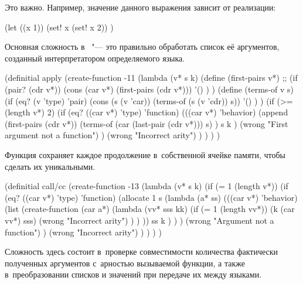 \noindent
Это важно. Например, значение данного выражения зависит от реализации:

\begin{code:lisp}
(let ((x 1))
  (set! x (set! x 2)) )
\end{code:lisp}



Основная сложность в~ "--- это правильно обработать список её
аргументов, созданный интерпретатором определяемого языка.

\begin{code:lisp}
(definitial apply
  (create-function
   -11 (lambda (v* s k)
         (define (first-pairs v*)
           ;; 
           (if (pair? (cdr v*))
               (cons (car v*) (first-pairs (cdr v*)))
               '() ) )
         (define (terms-of v s)
           (if (eq? (v 'type) 'pair)
               (cons (s (v 'car)) (terms-of (s (v 'cdr)) s))
               '() ) )
         (if (>= (length v*) 2)
             (if (eq? ((car v*) 'type) 'function)
                 (((car v*) 'behavior)
                  (append (first-pairs (cdr v*))
                          (terms-of (car (last-pair (cdr v*))) s) )
                  s k )
                 (wrong "First argument not a function") )
             (wrong "Incorrect arity") ) ) ) )
\end{code:lisp}

Функция  сохраняет каждое продолжение в~собственной ячейке памяти,
чтобы сделать их уникальными.

\begin{code:lisp}
(definitial call/cc
  (create-function
   -13 (lambda (v* s k)
         (if (= 1 (length v*))
             (if (eq? ((car v*) 'type) 'function)
                 (allocate 1 s
                  (lambda (a* ss)
                    (((car v*) 'behavior)
                     (list (create-function
                            (car a*)
                            (lambda (vv* sss kk)
                              (if (= 1 (length vv*))
                                  (k (car vv*) sss)
                                  (wrong "Incorrect arity") ) ) ))
                     ss k ) ) )
                 (wrong "Argument not a function") )
             (wrong "Incorrect arity") ) ) ) )
\end{code:lisp}



Сложность здесь состоит в~проверке совместимости количества фактически
полученных аргументов с~арностью вызываемой функции, а также в~преобразовании
списков и значений при передаче их между языками.

